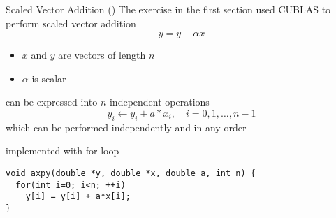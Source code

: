 \begin{frame}[fragile]{}
    \begin{info}{Scaled Vector Addition (\axpy)}
        The exercise in the first section used CUBLAS to perform scaled vector addition
            $$y = y + \alpha x$$
            \vspace{-15pt}
        \begin{itemize}
            \item $x$ and $y$ are vectors of length $n$
            \item $\alpha$ is scalar
        \end{itemize}
        \axpy can be expressed into $n$ independent operations
        $$y_i \leftarrow y_i + a*x_i,\quad i = {0, 1, \dots, n-1}$$
        which can be performed independently and in any order
    \end{info}

    \begin{code}{\axpy implemented with for loop}
        \begin{lstlisting}[style=boxcuda]
void axpy(double *y, double *x, double a, int n) {
  for(int i=0; i<n; ++i)
    y[i] = y[i] + a*x[i];
}
        \end{lstlisting}
    \end{code}

\end{frame}

